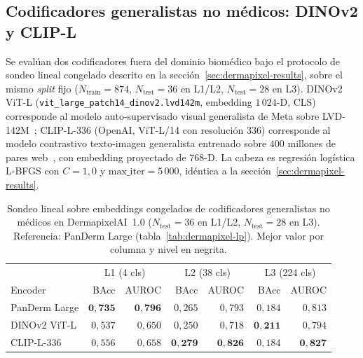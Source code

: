 \subsection*{Codificadores generalistas no médicos: DINOv2 y CLIP-L}
\label{sec:dermapixel-extra-encoders}

Se evalúan dos codificadores fuera del dominio biomédico bajo el
protocolo de sondeo lineal congelado descrito en la
secci\'on~\ref{sec:dermapixel-results}, sobre el mismo
\emph{split} fijo ($N_{\mathrm{train}} = 874$,
$N_{\mathrm{test}} = 36$ en L1/L2, $N_{\mathrm{test}} = 28$ en
L3). DINOv2 ViT-L (\texttt{vit\_large\_patch14\_dinov2.lvd142m},
embedding $1\,024$-D, CLS) corresponde al modelo auto-supervisado
visual generalista de Meta sobre LVD-142M~\cite{dinov2}; CLIP-L-336
(OpenAI, ViT-L/14 con resolución $336$) corresponde al modelo
contrastivo texto-imagen generalista entrenado sobre $400$
millones de pares web~\cite{clip2021}, con embedding proyectado de
$768$-D. La cabeza es regresión logística L-BFGS con $C = 1{,}0$ y
$\mathrm{max\_iter} = 5\,000$, idéntica a la
secci\'on~\ref{sec:dermapixel-results}.

\begin{table}[H]
\centering
\footnotesize
\setlength{\tabcolsep}{4pt}
\renewcommand{\arraystretch}{0.95}
\caption{Sondeo lineal sobre embeddings congelados de
codificadores generalistas no médicos en DermapixelAI~1.0
($N_{\mathrm{test}} = 36$ en L1/L2, $N_{\mathrm{test}} = 28$ en
L3). Referencia: PanDerm Large
(tabla~\ref{tab:dermapixel-lp}). Mejor valor por columna y nivel en
negrita.}
\label{tab:dermapixel-extra-encoders}
\begin{tabular}{lrrrrrr}
\hline
              & \multicolumn{2}{c}{L1 (4 cls)} & \multicolumn{2}{c}{L2 (38 cls)} & \multicolumn{2}{c}{L3 (224 cls)} \\
Encoder       & BAcc & AUROC & BAcc & AUROC & BAcc & AUROC \\
\hline
PanDerm Large & $\mathbf{0{,}735}$ & $\mathbf{0{,}796}$
              & $0{,}265$          & $0{,}793$
              & $0{,}184$          & $0{,}813$ \\
DINOv2 ViT-L  & $0{,}537$          & $0{,}650$
              & $0{,}250$          & $0{,}718$
              & $\mathbf{0{,}211}$ & $0{,}794$ \\
CLIP-L-336    & $0{,}556$          & $0{,}658$
              & $\mathbf{0{,}279}$ & $\mathbf{0{,}826}$
              & $0{,}184$          & $\mathbf{0{,}827}$ \\
\hline
\end{tabular}
\end{table}

